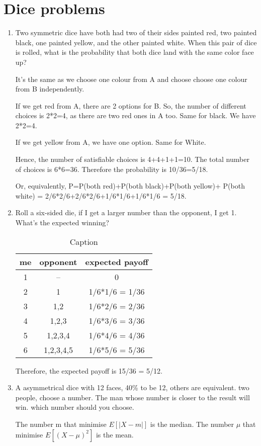 \documentclass{article}
\begin{document}
\section{Dice problems}
\begin{enumerate}

    \item Two symmetric dice have both had two of their sides painted red, two painted black, one painted yellow, and the other painted white. When this pair of dice is rolled, what is the probability that both dice land with the same color face up?

    It's the same as we choose one colour from A and choose choose one colour from B independently. 

    If we get red from A, there are 2 options for B. So, the number of different choices is 2*2=4, as there are two red ones in A too. Same for black. We have 2*2=4.

    If we get yellow from A, we have one option. Same for White.

    Hence, the number of satisfiable choices is 4+4+1+1=10. The total number of choices is 6*6=36. Therefore the probability is 10/36=5/18. 

    Or, equivalently, P=P(both red)+P(both black)+P(both yellow)+ P(both white) = 2/6*2/6+2/6*2/6+1/6*1/6+1/6*1/6 = 5/18.

    \item Roll a six-sided die, if I get a larger number than the opponent, I get 1. What's the expected winning?

    \begin{table}[h!]
        \centering
        \begin{tabular}{c|c|c}
             \hline 
             me &  opponent & expected payoff\\
             \hline 
             1 & -- & 0\\
             \hline 
             2 & 1 & 1/6*1/6 = 1/36 \\
             \hline 
             3 & {1,2} & 1/6*2/6 = 2/36 \\
             \hline 
             4 & {1,2,3} & 1/6*3/6 = 3/36 \\
             \hline 
             5 & {1,2,3,4} & 1/6*4/6 = 4/36 \\
             \hline 
             6 & {1,2,3,4,5} & 1/6*5/6 = 5/36 \\
             \hline 
        \end{tabular}
        \caption{Caption}
        \label{tab:my_label}
    \end{table}
    Therefore, the expected payoff is 15/36 = 5/12.


        \item A asymmetrical dice with 12 faces, 40\% to be 12, others are equivalent. two people, choose a number. The man whose number is closer to the result will win. which number should you choose.

    The number m that minimise $E[|X-m|] $ is the median. The number $\mu$ that minimise $E[(X-\mu)^2]$ is the mean. 
\end{enumerate}
\end{document}
